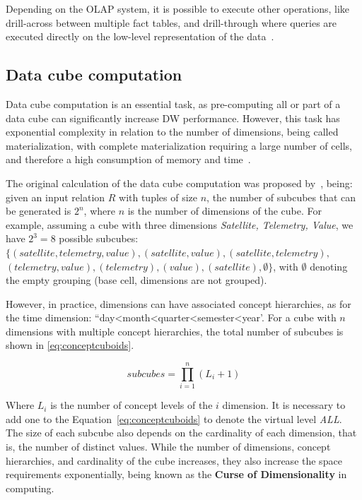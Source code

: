 Depending on the OLAP system, it is possible to execute other operations, like drill-across between multiple fact tables, and drill-through where queries are executed directly on the low-level representation of the data~\cite{hanDataMiningConcepts2011}.

\subsection{Data cube computation}\label{ch:fun:cube:comp}

Data cube computation is an essential task, as pre-computing all or part of a data cube can significantly increase DW performance.
However, this task has exponential complexity in relation to the number of dimensions, being called materialization, with complete materialization requiring a large number of cells, and therefore a high consumption of memory and time~\cite{hanDataMiningConcepts2011}.

The original calculation of the data cube computation was proposed by~, being: given an input relation $R$ with tuples of size $n$, the number of subcubes that can be generated is $2^n$, where $n$ is the number of dimensions of the cube.
For example, assuming a cube with three dimensions \textit{Satellite, Telemetry, Value}, we have $2^3 = 8$ possible subcubes: $\{(satellite, telemetry, value), (satellite, value), (satellite, telemetry),$ $(telemetry, value), (telemetry), (value), (satellite), \emptyset \}$, with $\emptyset$ denoting the empty grouping (base cell, dimensions are not grouped).

However, in practice, dimensions can have associated concept hierarchies, as for the time dimension: ``day<month<quarter<semester<year'.
For a cube with $n$ dimensions with multiple concept hierarchies, the total number of subcubes is shown in \autoref{eq:conceptcuboids}.

\begin{equation}
  subcubes = \prod_{i=1}^n (L_i + 1)
\label{eq:conceptcuboids}
\end{equation}

Where $L_i$ is the number of concept levels of the $i$ dimension.
It is necessary to add one to the Equation~\ref{eq:conceptcuboids} to denote the virtual level \textit{ALL}.
The size of each subcube also depends on the cardinality of each dimension, that is, the number of distinct values.
While the number of dimensions, concept hierarchies, and cardinality of the cube increases, they also increase the space requirements exponentially, being known as the \textbf{Curse of Dimensionality} in computing.

